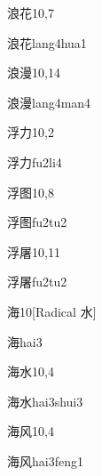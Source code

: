 \begin{entry}{浪花}{10,7}
  \begin{phonetics}{浪花}{lang4hua1}
  \end{phonetics}
\end{entry}

\begin{entry}{浪漫}{10,14}
  \begin{phonetics}{浪漫}{lang4man4}
  \end{phonetics}
\end{entry}

\begin{entry}{浮力}{10,2}
  \begin{phonetics}{浮力}{fu2li4}
  \end{phonetics}
\end{entry}

\begin{entry}{浮图}{10,8}
  \begin{phonetics}{浮图}{fu2tu2}
  \end{phonetics}
\end{entry}

\begin{entry}{浮屠}{10,11}
  \begin{phonetics}{浮屠}{fu2tu2}
  \end{phonetics}
\end{entry}

\begin{entry}{海}{10}[Radical 水]
  \begin{phonetics}{海}{hai3}
  \end{phonetics}
\end{entry}

\begin{entry}{海水}{10,4}
  \begin{phonetics}{海水}{hai3shui3}
  \end{phonetics}
\end{entry}

\begin{entry}{海风}{10,4}
  \begin{phonetics}{海风}{hai3feng1}
  \end{phonetics}
\end{entry}


